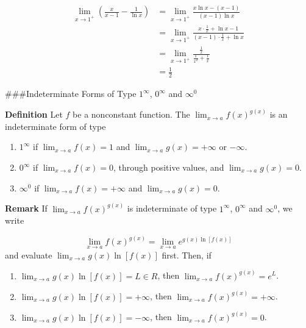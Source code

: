 \documentclass[
  letterpaper,
  DIV=11,
  numbers=noendperiod]{scrartcl}
\begin{document}
\[
\begin{aligned}
\displaystyle\lim_{x\to 1^+}{\left(\frac{x}{x-1}-\frac{1}{\ln x}\right)}&=\displaystyle\lim_{x\to 1^+}{\frac{x\ln x -(x-1)}{(x-1)\ln x}}\\&=\displaystyle\lim_{x\to 1^+}{\frac{x\cdot \frac{1}{x}+\ln x-1}{(x-1)\cdot \frac{1}{x}+\ln x}}\\&=\displaystyle\lim_{x\to 1^+}{\frac{\frac{1}{x}}{\frac{1}{x^2}+\frac{1}{x}}}\\&=\frac{1}{2}
\end{aligned}
\]

\#\#\#Indeterminate Forms of Type \(1^\infty\), \(0^\infty\) and
\(\infty ^0\)

\leavevmode{}%
\textbf{Definition} Let \(f\) be a nonconstant function. The
\(\displaystyle\lim_{x\to a}{f(x)^{g(x)}}\) is an indeterminate form of
type

\begin{enumerate}
\def\labelenumi{\arabic{enumi}.}
\item
  \(1^\infty\) if \(\displaystyle\lim_{x\to a}{f(x)=1}\) and
  \(\displaystyle\lim_{x\to a}{g(x)=+\infty}\) or \(-\infty\).
\item
  \(0^\infty\) if \(\displaystyle\lim_{x\to a}{f(x)=0}\), through
  positive values, and \(\displaystyle\lim_{x\to a}{g(x)=0}\).
\item
  \(\infty ^0\) if \(\displaystyle\lim_{x\to a}{f(x)=+\infty}\) and
  \(\displaystyle\lim_{x\to a}{g(x)=0}\).
\end{enumerate}

\leavevmode{}%
\textbf{Remark} If \(\displaystyle\lim_{x\to a}{f(x)^{g(x)}}\) is
indeterminate of type \(1^\infty\), \(0^\infty\) and \(\infty ^0\), we
write

\[
\displaystyle\lim_{x\to a}{f(x)^{g(x)}}=\displaystyle\lim_{x\to a}{e^{g(x) \ln [f(x)]}}
\] and evaluate \(\displaystyle\lim_{x\to a}{g(x) \ln [f(x)]}\) first.
Then, if

\begin{enumerate}
\def\labelenumi{\arabic{enumi}.}
\item
  \(\displaystyle\lim_{x\to a}{g(x) \ln [f(x)]}=L \in R\), then
  \(\displaystyle\lim_{x\to a}{f(x)^{g(x)}}=e^L\).
\item
  \(\displaystyle\lim_{x\to a}{g(x) \ln [f(x)]}=+\infty\), then
  \(\displaystyle\lim_{x\to a}{f(x)^{g(x)}}=+\infty\).
\item
  \(\displaystyle\lim_{x\to a}{g(x) \ln [f(x)]}=-\infty\), then
  \(\displaystyle\lim_{x\to a}{f(x)^{g(x)}}=0\).
\end{enumerate}
\end{document}
